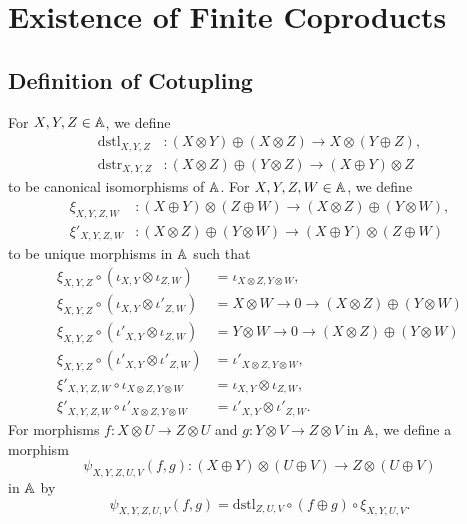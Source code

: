 \section{Existence of Finite Coproducts}

\subsection{Definition of Cotupling}

For $X,Y,Z \in \mathbb{A}$, we define
\begin{align*}
  \mathrm{dstl}_{X,Y,Z} &\colon (X \otimes Y) \oplus (X \otimes Z) \to X
                          \otimes (Y \oplus Z), \\
  \mathrm{dstr}_{X,Y,Z} &\colon (X \otimes Z) \oplus (Y \otimes Z) \to
  (X \oplus Y) \otimes Z  
\end{align*}
to be canonical isomorphisms of $\mathbb{A}$.
For $X,Y,Z,W \in \mathbb{A}$, we define
\begin{align*}
  \xi_{X,Y,Z,W} &\colon (X \oplus Y) \otimes (Z \oplus W) \to (X \otimes
                  Z) \oplus (Y \otimes W), \\
  \xi'_{X,Y,Z,W} &\colon (X \otimes Z) \oplus (Y \otimes W) \to (X
                   \oplus Y) \otimes (Z \oplus W) 
\end{align*}
to be unique morphisms in $\mathbb{A}$ such that
\begin{align*}
  \xi_{X,Y,Z} \circ (\iota_{X,Y} \otimes \iota_{Z,W}) &= \iota_{X \otimes Z,Y \otimes W}, \\
  \xi_{X,Y,Z} \circ (\iota_{X,Y} \otimes \iota'_{Z,W}) &=
  X \otimes W \longrightarrow 0 \longrightarrow (X \otimes Z) \oplus (Y \otimes W) \\
  \xi_{X,Y,Z} \circ (\iota'_{X,Y} \otimes \iota_{Z,W}) &=
  Y \otimes W \longrightarrow 0 \longrightarrow (X \otimes Z) \oplus (Y \otimes W) \\
  \xi_{X,Y,Z} \circ (\iota'_{X,Y} \otimes \iota'_{Z,W}) &=
  \iota'_{X \otimes Z,Y \otimes W}, \\
  \xi'_{X,Y,Z,W} \circ \iota_{X \otimes Z,Y \otimes W} &= \iota_{X,Y} \otimes \iota_{Z,W}, \\
  \xi'_{X,Y,Z,W} \circ \iota'_{X \otimes Z,Y \otimes W} &= \iota'_{X,Y} \otimes \iota'_{Z,W}.
\end{align*}
For morphisms $f \colon X \otimes U \to Z \otimes U$ and $g \colon Y \otimes V \to
Z \otimes V$ in $\mathbb{A}$, we define a morphism
\begin{equation*}
 \psi_{X,Y,Z,U,V}(f,g) \colon (X \oplus Y) \otimes (U \oplus V)
 \to Z \otimes (U \oplus V) 
\end{equation*}
in $\mathbb{A}$ by
\begin{equation*}
  \psi_{X,Y,Z,U,V}(f,g) =
  \mathrm{dstl}_{Z,U,V} \circ (f \oplus g) \circ \xi_{X,Y,U,V}.
\end{equation*}


